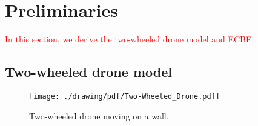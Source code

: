 
\section{Preliminaries}
\textcolor{red}{In this section, we derive the two-wheeled drone model and ECBF.}
\subsection{Two-wheeled drone model}
\begin{figure}[t]
    \centering
    \texttt{[image: ./drawing/pdf/Two-Wheeled\_Drone.pdf]}
    \caption{Two-wheeled drone moving on a wall.}
    \label{fig:two-wheeled_drone_moving_on_a_wall}
\end{figure}

